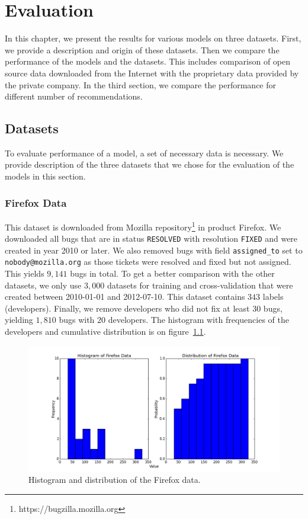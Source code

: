 \chapter{Evaluation}

In this chapter, we present the results for various models on three datasets. First, we provide a description and origin of these datasets. Then we compare the performance of the models and the datasets. This includes comparison of open source data downloaded from the Internet with the proprietary data provided by the private company. In the third section, we compare the performance for different number of recommendations.

\section{Datasets}

To evaluate performance of a model, a set of necessary data is necessary. We provide description of the three datasets that we chose for the evaluation of the models in this section.

\subsection{Firefox Data}

This dataset is downloaded from Mozilla repository\footnote{https://bugzilla.mozilla.org} in product Firefox. We downloaded all bugs that are in status \texttt{RESOLVED} with resolution \texttt{FIXED} and were created in year 2010 or later. We also removed bugs with field \texttt{assigned\_to} set to \texttt{nobody@mozilla.org} as those tickets were resolved and fixed but not assigned. This yields $9,141$ bugs in total. To get a better comparison with the other datasets, we only use $3,000$ datasets for training and cross-validation that were created between 2010-01-01 and 2012-07-10. This dataset contains $343$ labels (developers). Finally, we remove developers who did not fix at least $30$ bugs, yielding $1,810$ bugs with $20$ developers. The histogram with frequencies of the developers and cumulative distribution is on figure~\ref{fig:datasets.firefox.dist}.

\begin{figure}[htbp]
    \centering
        \includegraphics[width=\textwidth]{./images/distribution/firefox.png}
    \caption{Histogram and distribution of the Firefox data.}
    \label{fig:datasets.firefox.dist}
\end{figure}

